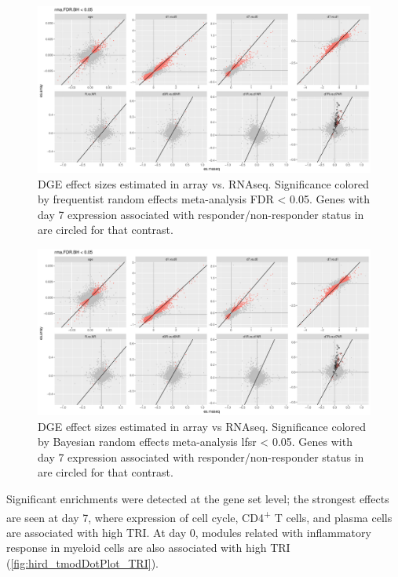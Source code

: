 \begin{figure}
    \includegraphics[width=1.0\textwidth,page=1]{mainmatter/figures/chapter_02/plot_dge_eqtl.DGE.effectSizeComparison.pdf}
    \caption{DGE effect sizes estimated in array vs. \gls{RNAseq}. Significance colored by frequentist random effects meta-analysis FDR < 0.05. Genes with day 7 expression associated with responder/non-responder status in \autocite{sobolev2016AdjuvantedInfluenzaH1N1Vaccination} are circled for that contrast.}
    \label{fig:hird_DGE_effectSizeComparisons_rma}
\end{figure}

\begin{figure}
    \includegraphics[width=1.0\textwidth,page=2]{mainmatter/figures/chapter_02/plot_dge_eqtl.DGE.effectSizeComparison.pdf}
    \caption{DGE effect sizes estimated in array vs \gls{RNAseq}. Significance colored by Bayesian random effects meta-analysis lfsr < 0.05. Genes with day 7 expression associated with responder/non-responder status in \autocite{sobolev2016AdjuvantedInfluenzaH1N1Vaccination} are circled for that contrast.}
    \label{fig:hird_DGE_effectSizeComparisons_bayesmeta}
\end{figure}

Significant enrichments were detected at the gene set level; the strongest effects are seen at day 7, where expression of cell cycle, CD4\textsuperscript{+} T cells, and plasma cells are associated with high \gls{TRI}.
At day 0, modules related with inflammatory response in myeloid cells are also associated with high \gls{TRI} (\cref{fig:hird_tmodDotPlot_TRI}).

